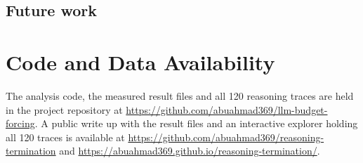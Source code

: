 \documentclass[conference]{IEEEtran}
\newif\ifdraft
\newcommand{\writehere}[2]{%
  \ifdraft
    {\color{orange!75!black}\small\textbf{[WRITE: #1]}\itshape\ #2\par}
    \medskip
  \fi}
\begin{document}
\subsection{Future work}

\writehere{1 paragraph, four directions}{
Cache reusing forcing, which would cut the cost to roughly the five tokens it
actually generates. Learned termination, since about three quarters of failures
never derive the answer, making the model conclude sooner addresses the cause
rather than the symptom. Generality, whether the decomposition holds for other
compact reasoning models and on code generation as well as mathematics. And
evaluation protocol, since publishing the truncation rate alongside accuracy would
cost nothing and make results across different budgets comparable.}

\section*{Code and Data Availability}

The analysis code, the measured result files and all 120 reasoning traces are held
in the project repository at
\url{https://github.com/abuahmad369/llm-budget-forcing}.
A public write up with the result files and an interactive explorer holding all
120 traces is available at
\url{https://github.com/abuahmad369/reasoning-termination}
and \url{https://abuahmad369.github.io/reasoning-termination/}.
\end{document}
